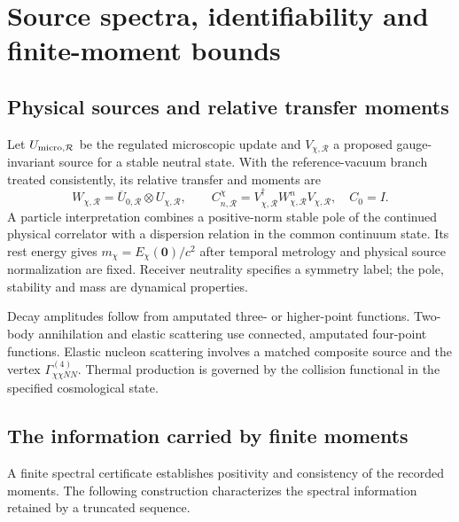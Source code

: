 \section{Source spectra, identifiability and finite-moment bounds}\label{sec:spectral}
\subsection{Physical sources and relative transfer moments}

Let $U_{\rm micro,\mathcal R}$ be the regulated microscopic update and $V_{\chi,\mathcal R}$ a proposed gauge-invariant source for a stable neutral state. With the reference-vacuum branch treated consistently, its relative transfer and moments are
\begin{equation}
W_{\chi,\mathcal R}=\overline U_{0,\mathcal R}\otimes U_{\chi,\mathcal R},\qquad
C_{n,\mathcal R}^{\chi}=V_{\chi,\mathcal R}^\dagger W_{\chi,\mathcal R}^{n}V_{\chi,\mathcal R},\quad C_0=I.
\end{equation}
A particle interpretation combines a positive-norm stable pole of the continued physical correlator with a dispersion relation in the common continuum state. Its rest energy gives $m_\chi=E_\chi(\mathbf 0)/c^2$ after temporal metrology and physical source normalization are fixed. Receiver neutrality specifies a symmetry label; the pole, stability and mass are dynamical properties.

Decay amplitudes follow from amputated three- or higher-point functions. Two-body annihilation and elastic scattering use connected, amputated four-point functions. Elastic nucleon scattering involves a matched composite source and the vertex $\Gamma^{(4)}_{\chi\chi NN}$. Thermal production is governed by the collision functional in the specified cosmological state.

\subsection{The information carried by finite moments}
\label{sec:moment}
A finite spectral certificate establishes positivity and consistency of the recorded moments. The following construction characterizes the spectral information retained by a truncated sequence.

